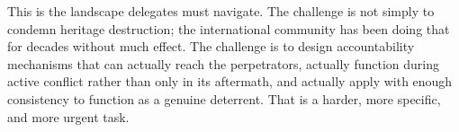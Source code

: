 This is the landscape delegates must navigate. The challenge is not simply to condemn heritage destruction; the international community has been doing that for decades without much effect. The challenge is to design accountability mechanisms that can actually reach the perpetrators, actually function during active conflict rather than only in its aftermath, and actually apply with enough consistency to function as a genuine deterrent. That is a harder, more specific, and more urgent task.
